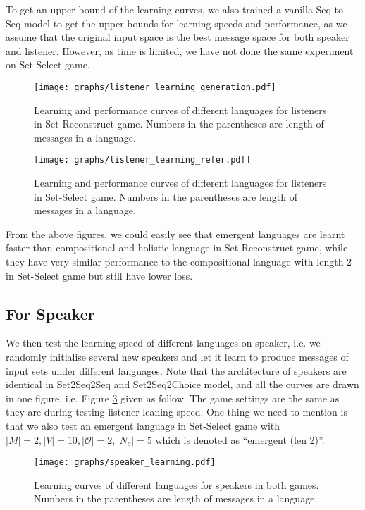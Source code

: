To get an upper bound of the learning curves, we also trained a vanilla Seq-to-Seq model to get the upper bounds for learning speeds and performance, as we assume that the original input space is the best message space for both speaker and listener. However, as time is limited, we have not done the same experiment on Set-Select game.

\begin{figure}[!h]
    \centering
    \texttt{[image: graphs/listener\_learning\_generation.pdf]}
    \caption{Learning and performance curves of different languages for listeners in Set-Reconstruct game. Numbers in the parentheses are length of messages in a language.}
    \label{fig4.1:listener_learning_generation}
\end{figure}

\begin{figure}[!h]
    \centering
    \texttt{[image: graphs/listener\_learning\_refer.pdf]}
    \caption{Learning and performance curves of different languages for listeners in Set-Select game. Numbers in the parentheses are length of messages in a language.}
    \label{fig4.2:listener_learning_refer}
\end{figure}

From the above figures, we could easily see that emergent languages are learnt faster than compositional and holistic language in Set-Reconstruct game, while they have very similar performance to the compositional language with length 2 in Set-Select game but still have lower loss.

\subsection{For Speaker}
\label{ssec4.3.2:learning_speaker}

We then test the learning speed of different languages on speaker, i.e. we randomly initialise several new speakers and let it learn to produce messages of input sets under different languages. Note that the architecture of speakers are identical in Set2Seq2Seq and Set2Seq2Choice model, and all the curves are drawn in one figure, i.e. Figure \ref{fig4.3:speaker_learning} given as follow. The game settings are the same as they are during testing listener leaning speed. One thing we need to mention is that we also test an emergent language in Set-Select game with $|M|=2, |V|=10, |\mathcal{O}|=2, |N_o|=5$ which is denoted as ``emergent (len 2)''.

\begin{figure}[!h]
    \centering
    \texttt{[image: graphs/speaker\_learning.pdf]}
    \caption{Learning curves of different languages for speakers in both games. Numbers in the parentheses are length of messages in a language.}
    \label{fig4.3:speaker_learning}
\end{figure}

